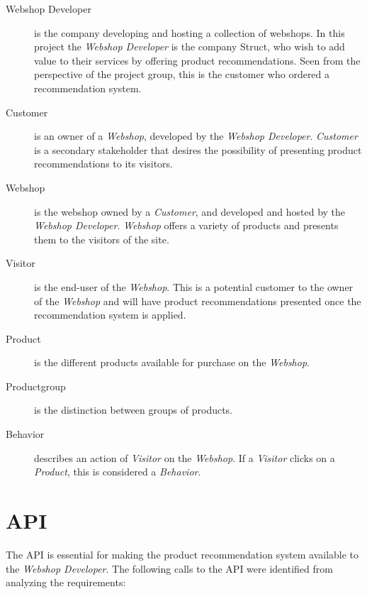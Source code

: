 \begin{description}
	\item[Webshop Developer] is the company developing and hosting a collection of webshops. In this project the \textit{Webshop Developer} is the company \gls{Struct}, who wish to add value to their services by offering product recommendations. Seen from the perspective of the project group, this is the customer who ordered a recommendation system.
	\item[Customer] is an owner of a \textit{Webshop}, developed by the \textit{Webshop Developer}. \textit{Customer} is a secondary stakeholder that desires the possibility of presenting product recommendations to its visitors.
	\item[Webshop] is the webshop owned by a \textit{Customer}, and developed and hosted by the \textit{Webshop Developer}. \textit{Webshop} offers a variety of products and presents them to the visitors of the site.
	\item[Visitor] is the end-user of the \textit{Webshop}. This is a potential customer to the owner of the \textit{Webshop} and will have product recommendations presented once the recommendation system is applied.
	\item[Product] is the different products available for purchase on the \textit{Webshop}. 
	\item[Productgroup] is the distinction between groups of products.
	\item[Behavior] describes an action of \textit{Visitor} on the \textit{Webshop}. If a \textit{Visitor} clicks on a \textit{Product}, this is considered a \textit{Behavior}. 
\end{description}

\section{API}
The API is essential for making the product recommendation system available to the \textit{Webshop Developer}. The following calls to the API were identified from analyzing the requirements:


